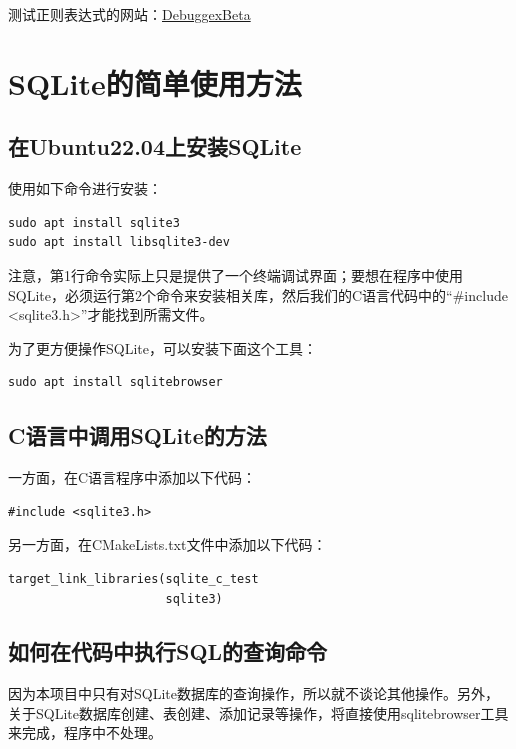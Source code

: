 测试正则表达式的网站：\href{https://www.debuggex.com/?flavor=pcre#cheatsheet}{DebuggexBeta}


\chapter{SQLite的简单使用方法}


\section{在Ubuntu22.04上安装SQLite}
使用如下命令进行安装：
\begin{verbatim}
sudo apt install sqlite3
sudo apt install libsqlite3-dev
\end{verbatim}

注意，第1行命令实际上只是提供了一个终端调试界面；要想在程序中使用SQLite，必须运行第2个命令来安装相关库，然后我们的C语言代码中的“\#include <sqlite3.h>”才能找到所需文件。

为了更方便操作SQLite，可以安装下面这个工具：
\begin{verbatim}
sudo apt install sqlitebrowser
\end{verbatim}


\section{C语言中调用SQLite的方法}
一方面，在C语言程序中添加以下代码：
\begin{verbatim}
#include <sqlite3.h>
\end{verbatim}

另一方面，在CMakeLists.txt文件中添加以下代码：
\begin{verbatim}
target_link_libraries(sqlite_c_test
                      sqlite3)
\end{verbatim}


\section{如何在代码中执行SQL的查询命令}
因为本项目中只有对SQLite数据库的查询操作，所以就不谈论其他操作。另外，关于SQLite数据库创建、表创建、添加记录等操作，将直接使用sqlitebrowser工具来完成，程序中不处理。

